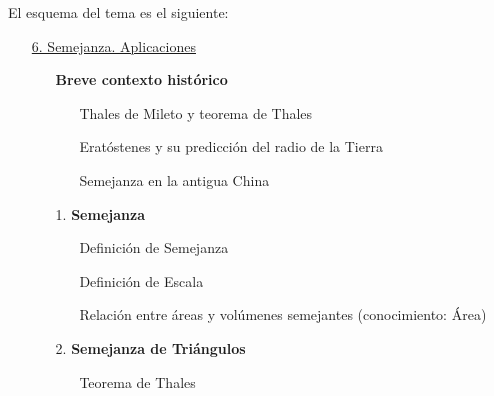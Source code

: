 	El esquema del tema es el siguiente:
	\begin{itemize}
		\item[] \underline{6. Semejanza. Aplicaciones}
		\begin{itemize}
			\item[\ding{43}] \textbf{Breve contexto histórico}
			\begin{itemize}
				\item[\textbullet] Thales de Mileto y teorema de Thales
				\item[\textbullet]Eratóstenes y su predicción del radio de la Tierra
				\item[\textbullet] Semejanza en la antigua China
			\end{itemize}
			\item[1.] \textbf{Semejanza}
			\begin{itemize}
				\item[\textbullet] Definición de Semejanza%
				\item[\textbullet] Definición de Escala%
				\item[\textbullet] Relación entre áreas y volúmenes semejantes (conocimiento: Área)%
			\end{itemize}
			\item[2.] \textbf{Semejanza de Triángulos}
			\begin{itemize}
				\item[\textbullet] Teorema de Thales%

\end{itemize}
\end{itemize}
\end{itemize}
